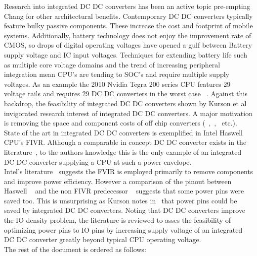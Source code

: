 \documentclass[letterpaper,twocolumn,10pt]{article}
\begin{document}
\indent Research into integrated DC DC converters has been an active topic pre-empting Chang for other architectural benefits. Contemporary DC DC converters typically feature bulky passive components. These increase the cost and footprint of mobile systems. Additionally, battery technology does not enjoy the improvement rate of CMOS, so drops of digital operating voltages have opened a gulf between Battery supply voltage and IC input voltages. Techniques for extending battery life such as multiple core voltage domains and the trend of increasing peripheral integration mean CPU's are tending to SOC's and require multiple supply voltages. As an example the 2010 Nvidia Tegra 200 series CPU features 29 voltage rails and requires 29 DC DC converters in the worst case ~\cite{NVidia2010}. %
 Against this backdrop, the feasibility of integrated DC DC converters shown by Kurson et al~\cite{Kurson2003} invigorated research interest of integrated DC DC converters. A major motivation is removing the space and component costs of off chip converters (~\cite{PhuckLe2011},~\cite{Hongwei2011},~\cite{Yogesh2010} etc.).\\
\indent State of the art in integrated DC DC converters is exemplified in Intel Haswell CPU's FIVR. Although a comparable in concept DC DC converter exists in the literature~\cite{Sturcken2012}, to the authors knowledge this is the only example of an integrated DC DC converter supplying a CPU at such a power envelope.\\
Intel's literature~\cite{Intel2010} %
suggests the FVIR is employed primarily to remove components and improve power efficiency. However a comparison of the pinout between Haswell ~\cite{IntelHaswell2014} and the non FIVR predecessor ~\cite{IntelIvyBridge2013} suggests that some power pins were saved too. This is unsurprising as Kurson notes in~\cite{Kurson2003} that power pins could be saved by integrated DC DC converters. Noting that DC DC converters improve the IO density problem, the literature is reviewed to asses the feasibility of optimizing power pins to IO pins by increasing supply voltage of an integrated DC DC converter greatly beyond typical CPU operating voltage.\\
\indent The rest of the document is ordered as follows:\\
\end{document}
